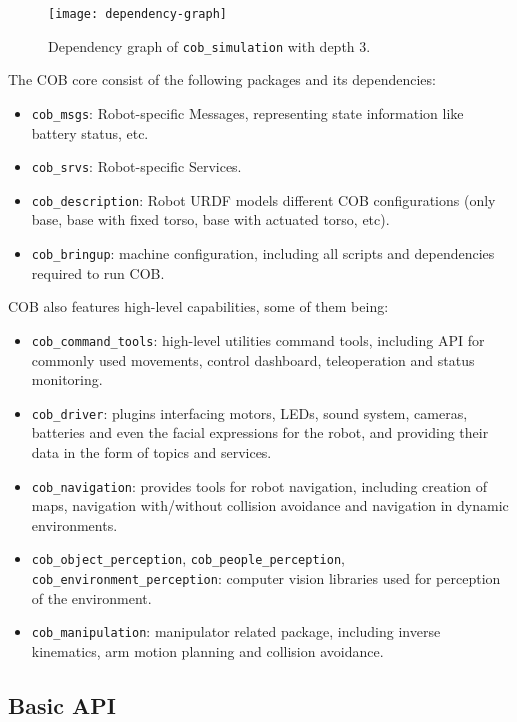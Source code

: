 \begin{figure}[!ht]
\centering
\texttt{[image: dependency-graph]}
\caption{Dependency graph of \texttt{cob\_simulation} with depth 3.}
\label{fig:dependency-graph}
\end{figure}


The COB core consist of the following packages and its dependencies:

\begin{itemize}
\item \texttt{cob\_msgs}: Robot-specific Messages, representing state information like battery status, etc.
\item \texttt{cob\_srvs}: Robot-specific Services.
\item \texttt{cob\_description}: Robot URDF models different COB configurations (only base, base with fixed torso, base with actuated torso, etc).
\item \texttt{cob\_bringup}: machine configuration, including all scripts and dependencies required to run COB.
\end{itemize}

COB also features high-level capabilities, some of them being:

\begin{itemize}
\item \texttt{cob\_command\_tools}: high-level utilities command tools, including API for commonly used movements, control dashboard, teleoperation and status monitoring.
\item \texttt{cob\_driver}: plugins interfacing motors, LEDs, sound system, cameras, batteries and even the facial expressions for the robot, and providing their data in the form of topics and services.
\item \texttt{cob\_navigation}: provides tools for robot navigation, including creation of maps, navigation with/without collision avoidance and navigation in dynamic environments.
\item \texttt{cob\_object\_perception}, \texttt{cob\_people\_perception}, \texttt{cob\_environment\_perception}: computer vision libraries used for perception of the environment.
\item \texttt{cob\_manipulation}: manipulator related package, including inverse kinematics, arm motion planning and collision avoidance.
\end{itemize}

\subsection{Basic API}

